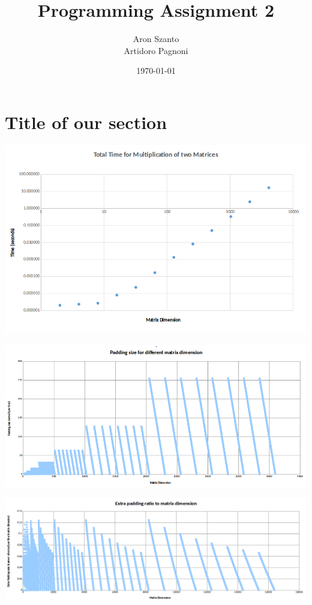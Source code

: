 \documentclass[11pt]{article}
\begin{document}
\title{Programming Assignment 2}
\author{Aron Szanto\\
 Artidoro Pagnoni}
\date{\today}
\maketitle


\section*{Title of our section}

\begin{center}
\includegraphics[scale=0.65]{totaltime}
\end{center}


\begin{center}
\includegraphics[scale=0.55]{padsize}
\end{center}


\begin{center}
\includegraphics[scale=0.45]{padratio}
\end{center}
\end{document}
